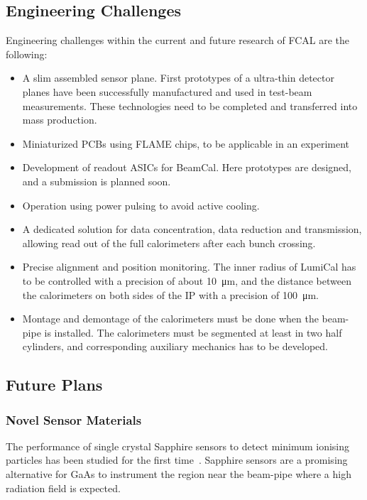 \subsection{Engineering Challenges}
Engineering challenges within the current and future research of FCAL are the following:
\begin{itemize}
\item A slim assembled sensor plane. First prototypes of a ultra-thin detector planes have been successfully 
manufactured and used in test-beam measurements.
These technologies need to be completed and transferred into mass production. 
\item Miniaturized PCBs using FLAME chips, to be applicable in an experiment 
\item Development of readout ASICs for BeamCal.
Here prototypes are designed, and a submission is planned soon.
\item Operation using power pulsing to avoid active cooling.
\item A dedicated solution for data concentration, data reduction and transmission, allowing read out of 
the full calorimeters after each bunch crossing.
\item Precise alignment and position monitoring. The inner radius of LumiCal has to be controlled with a precision
of about \SI{10}{\micro\meter}, and the distance between the 
calorimeters on both sides of the IP with a precision of \SI{100}{\micro\meter}.
\item Montage and demontage of the calorimeters must be done when the beam-pipe is installed. The calorimeters must be segmented at 
least in two half cylinders, and corresponding auxiliary mechanics has to be developed.
\end{itemize}

\subsection{Future Plans}

\subsubsection{Novel Sensor Materials}

The performance of single crystal Sapphire sensors to detect minimum ionising particles has been studied for the 
first time~\cite{1748-0221-10-08-P08008}. Sapphire sensors are a promising alternative for GaAs to instrument
the region near the beam-pipe where a high radiation field is expected.

